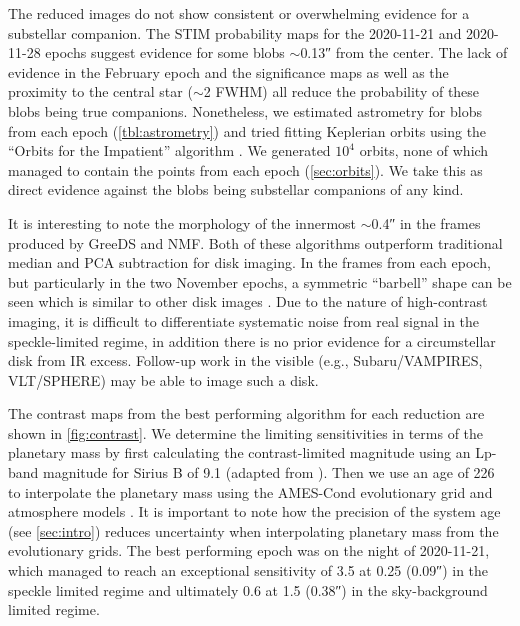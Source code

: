 \documentclass[twocolumn]{aastex631}
\begin{document}
The reduced images do not show consistent or overwhelming evidence for a substellar companion. The STIM probability maps for the 2020-11-21 and 2020-11-28 epochs suggest evidence for some blobs $\sim$\ang{;;0.13} from the center. The lack of evidence in the February epoch and the significance maps as well as the proximity to the central star ($\sim$2 FWHM) all reduce the probability of these blobs being true companions. Nonetheless, we estimated astrometry for blobs from each epoch (\autoref{tbl:astrometry}) and tried fitting Keplerian orbits using the ``Orbits for the Impatient'' algorithm \citep[OFTI;][]{blunt_orbits_2017}. We generated $10^4$ orbits, none of which managed to contain the points from each epoch (\autoref{sec:orbits}). We take this as direct evidence against the blobs being substellar companions of any kind.

It is interesting to note the morphology of the innermost $\sim$\ang{;;0.4} in the frames produced by GreeDS and NMF. Both of these algorithms outperform traditional median and PCA subtraction for disk imaging. In the frames from each epoch, but particularly in the two November epochs, a symmetric ``barbell'' shape can be seen which is similar to other disk images \citep[e.g., fig.~7][]{norris_vampires_2014}. Due to the nature of high-contrast imaging, it is difficult to differentiate systematic noise from real signal in the speckle-limited regime, in addition there is no prior evidence for a circumstellar disk from IR excess. Follow-up work in the visible (e.g., Subaru/VAMPIRES, VLT/SPHERE) may be able to image such a disk.

The contrast maps from the best performing algorithm for each reduction are shown in \autoref{fig:contrast}. We determine the limiting sensitivities in terms of the planetary mass by first calculating the contrast-limited magnitude using an Lp-band magnitude for Sirius B of 9.1 (adapted from \citealp{bonnet-bidaud_adonis_2008}). Then we use an age of \qty{226}{\mega\year} to interpolate the planetary mass using the AMES-Cond evolutionary grid and atmosphere models \citep{allard_models_2012}. It is important to note how the precision of the system age (see \autoref{sec:intro}) reduces uncertainty when interpolating planetary mass from the evolutionary grids. The best performing epoch was on the night of 2020-11-21, which managed to reach an exceptional sensitivity of \qty{3.5}{\jupitermass} at \qty{0.25}{\au} (\ang{;;0.09}) in the speckle limited regime and ultimately \qty{0.6}{\jupitermass} at \qty{1.5}{\au} (\ang{;;0.38}) in the sky-background limited regime.
\end{document}
